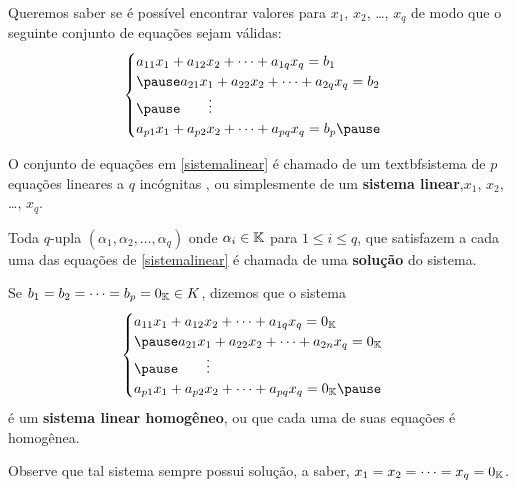 \documentclass{beamer}
\begin{document}
    \begin{frame}
        Queremos saber se é possível encontrar valores para  $x_1$, $x_2$, \dots, $x_q$ \pause de modo que o seguinte conjunto de equações sejam válidas: \pause
        \begin{equation}\label{sistemalinear}\index{Sistema Linear}
	    \begin{cases}
                a_{11}x_1 + a_{12}x_2 + \cdots + a_{1q}x_q = b_1\\\pause
                a_{21}x_1 + a_{22}x_2 + \cdots + a_{2q}x_q = b_2\\\pause
                \qquad \vdots\\
                a_{p1}x_1 + a_{p2}x_2 + \cdots + a_{pq}x_q = b_p\pause
            \end{cases}
        \end{equation}
        
        O conjunto de equações em \eqref{sistemalinear} é chamado de um \pause textbf{sistema de $p$ equa\c{c}\~oes lineares \pause a $q$ inc\'ognitas} \pause , ou simplesmente de um \textbf{sistema linear},\pause$x_1$, $x_2$, \dots, $x_q$.\pause

        \vspace{.3cm}

        Toda $q$-upla $(\alpha_1, \alpha_2, \dots, \alpha_q)$ \pause onde $\alpha_i \in \mathbb{K}$ para $1 \le i \le q$, \pause que satisfazem a cada uma das equa\c{c}\~oes de \eqref{sistemalinear} \pause \'e chamada de uma \textbf{solu\c{c}\~ao} do sistema.
    \end{frame}

    \begin{frame}
        Se $b_1 = b_2 = \cdots = b_p = 0_{\mathbb{K}} \in K$, \pause dizemos que o sistema\pause
        \begin{equation}\label{sistemalinearhomogeneo}\index{Sistema Linear}
            \begin{cases}
                a_{11}x_1 + a_{12}x_2 + \cdots + a_{1q}x_q = 0_\cp{K}\\\pause
                a_{21}x_1 + a_{22}x_2 + \cdots + a_{2n}x_q = 0_\cp{K}\\\pause
                \qquad \vdots\\
                a_{p1}x_1 + a_{p2}x_2 + \cdots + a_{pq}x_q = 0_\cp{K}\pause
            \end{cases}
        \end{equation}
        \'e um \textbf{sistema linear homog\^eneo}, \pause ou que cada uma de suas equa\c{c}\~oes \'e homog\^enea. \pause

        \vspace{.3cm}

        Observe que tal sistema sempre possui solu\c{c}\~ao, \pause a saber, $x_1 = x_2 = \cdots = x_q = 0_{\mathbb{K}}$.
    \end{frame}
\end{document}
